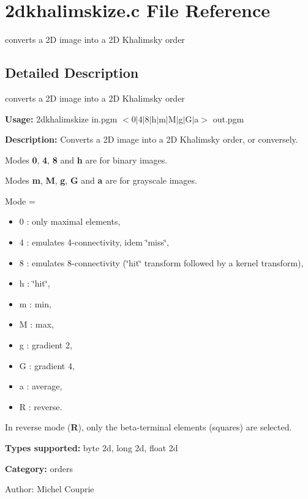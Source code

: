 \section{2dkhalimskize.c File Reference}
\label{2dkhalimskize_8c}
converts a 2D image into a 2D Khalimsky order  




\label{_details}
\subsection{Detailed Description}
converts a 2D image into a 2D Khalimsky order 

{\bf Usage:} 2dkhalimskize in.pgm $<$0$|$4$|$8$|$h$|$m$|$M$|$g$|$G$|$a$>$ out.pgm

{\bf Description:} Converts a 2D image into a 2D Khalimsky order, or conversely.

Modes {\bf 0}, {\bf 4}, {\bf 8} and {\bf h} are for binary images.

Modes {\bf m}, {\bf M}, {\bf g}, {\bf G} and {\bf a} are for grayscale images.

Mode = \begin{itemize}
\item 0 : only maximal elements, \item 4 : emulates 4-connectivity, idem \char`\"{}miss\char`\"{}, \item 8 : emulates 8-connectivity (\char`\"{}hit\char`\"{} transform followed by a kernel transform), \item h : \char`\"{}hit\char`\"{}, \item m : min, \item M : max, \item g : gradient 2, \item G : gradient 4, \item a : average, \item R : reverse.\end{itemize}
In reverse mode ({\bf R}), only the beta-terminal elements (squares) are selected.

{\bf Types supported:} byte 2d, long 2d, float 2d

{\bf Category:} orders

\begin{Desc}
\item[Author:]Michel Couprie \end{Desc}
